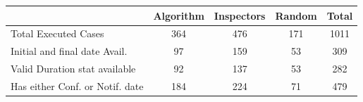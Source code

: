 {
\def\sym#1{\ifmmode^{#1}\else\(^{#1}\)\fi}
\begin{tabular}{l*{4}{c}}
\toprule
                    &   Algorithm&  Inspectors&      Random&       Total\\
\midrule
Total Executed Cases&         364&         476&         171&        1011\\
Initial and final date Avail.&          97&         159&          53&         309\\
Valid Duration stat available &          92&         137&          53&         282\\
Has either Conf. or Notif. date&         184&         224&          71&         479\\
\bottomrule
\end{tabular}
}
